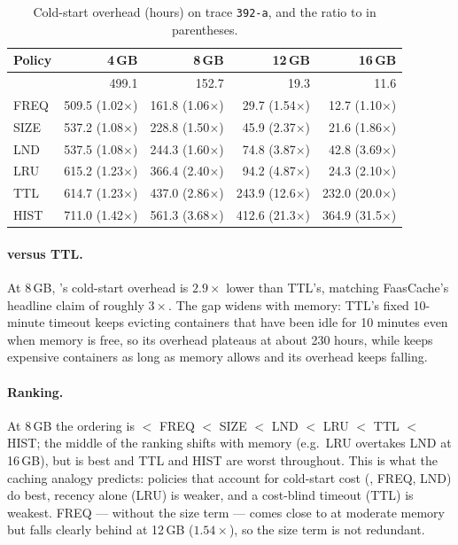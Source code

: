 \documentclass[11pt,a4paper]{article}
\newcommand{\gd}{\text{GD}}
\newcommand{\code}[1]{\texttt{#1}}
\begin{document}
\begin{table}[H]
\centering
\caption{Cold-start overhead (hours) on trace \code{392-a}, and the ratio to \gd{} in parentheses.}
\label{tab:baseline}
\begin{tabular}{@{}lrrrr@{}}
\toprule
\textbf{Policy} & \textbf{4\,GB} & \textbf{8\,GB} & \textbf{12\,GB} & \textbf{16\,GB} \\
\midrule
\gd{}  & 499.1 \phantom{(0.00$\times$)} & 152.7 \phantom{(0.00$\times$)} & 19.3 \phantom{(00.0$\times$)} & 11.6 \phantom{(00.0$\times$)} \\
FREQ   & 509.5 (1.02$\times$) & 161.8 (1.06$\times$) & 29.7 (1.54$\times$)  & 12.7 (1.10$\times$) \\
SIZE   & 537.2 (1.08$\times$) & 228.8 (1.50$\times$) & 45.9 (2.37$\times$)  & 21.6 (1.86$\times$) \\
LND    & 537.5 (1.08$\times$) & 244.3 (1.60$\times$) & 74.8 (3.87$\times$)  & 42.8 (3.69$\times$) \\
LRU    & 615.2 (1.23$\times$) & 366.4 (2.40$\times$) & 94.2 (4.87$\times$)  & 24.3 (2.10$\times$) \\
TTL    & 614.7 (1.23$\times$) & 437.0 (2.86$\times$) & 243.9 (12.6$\times$) & 232.0 (20.0$\times$) \\
HIST   & 711.0 (1.42$\times$) & 561.3 (3.68$\times$) & 412.6 (21.3$\times$) & 364.9 (31.5$\times$) \\
\bottomrule
\end{tabular}
\end{table}

\paragraph{\gd{} versus TTL.} At 8\,GB, \gd{}'s cold-start overhead is $2.9\times$ lower than
TTL's, matching FaasCache's headline claim of roughly $3\times$. The gap widens with memory:
TTL's fixed 10-minute timeout keeps evicting containers that have been idle for 10 minutes even
when memory is free, so its overhead plateaus at about 230 hours, while \gd{} keeps expensive
containers as long as memory allows and its overhead keeps falling.

\paragraph{Ranking.} At 8\,GB the ordering is
\gd{} $<$ FREQ $<$ SIZE $<$ LND $<$ LRU $<$ TTL $<$ HIST;
the middle of the ranking shifts with memory (e.g.\ LRU overtakes LND at 16\,GB), but \gd{} is
best and TTL and HIST are worst throughout.
This is what the caching analogy predicts: policies that account for cold-start cost
(\gd{}, FREQ, LND) do best, recency alone (LRU) is weaker, and a cost-blind timeout (TTL) is
weakest. FREQ --- \gd{} without the size term --- comes close to \gd{} at moderate memory but
falls clearly behind at 12\,GB ($1.54\times$), so the size term is not redundant.
\end{document}
